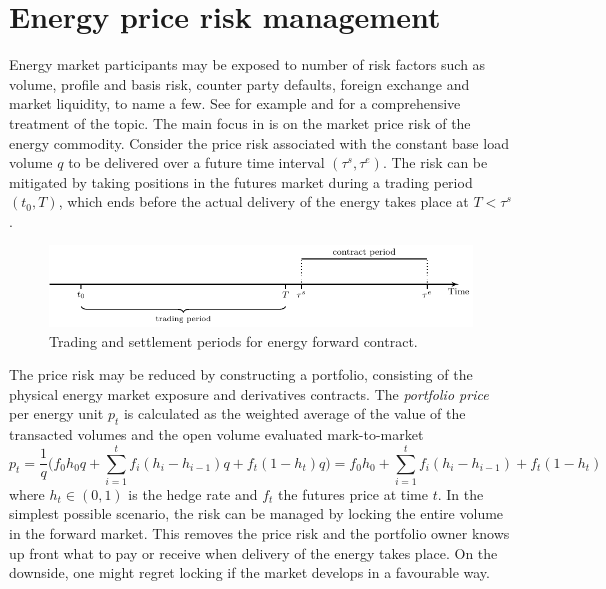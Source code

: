 \section{Energy price risk management}
Energy market participants may be exposed to number of risk factors such as volume, profile and basis risk, counter party defaults, foreign exchange and market liquidity, to name a few. See for example \citet{eydeland2002energy} and \citet{kirschen2018fundamentals} for a comprehensive treatment of the topic. The main focus in  is on the market price risk of the energy commodity. Consider the price risk associated with the constant base load volume $q$ to be delivered over a future time interval $(\tau^s, \tau^e)$. The risk can be mitigated by taking positions in the futures market during a trading period $(t_0, T)$, which ends before the actual delivery of the energy takes place at $T < \tau^s$. 
\begin{figure}[ht!]
\centering
\includegraphics [scale = 0.9] {trading_period.pdf}
\caption{Trading and settlement periods for energy forward contract.}
\label{fig:trading_period}
\end{figure}

The price risk may be reduced by constructing a portfolio, consisting of the physical energy market exposure and derivatives contracts. The \textit{portfolio price} per energy unit $p_t$ is calculated as the weighted average of the value of the transacted volumes and the open volume evaluated mark-to-market
\begin{equation}
p_t = \frac{1}{q} \bigg(f_0 h_0 q  + \sum_{i=1}^{t} f_i (h_i - h_{i-1}) q + f_t (1-h_t) q\bigg) = f_0 h_0 + \sum_{i=1}^{t} f_i (h_i - h_{i-1}) + f_t (1-h_t) 
\end{equation}
where $h_t\in(0,1)$ is the hedge rate and $f_t$ the futures price at time $t$. In the simplest possible scenario, the risk can be managed by locking the entire volume in the forward market. This removes the price risk and the portfolio owner knows up front what to pay or receive when delivery of the energy takes place. On the downside, one might regret locking if the market develops in a favourable way. 

